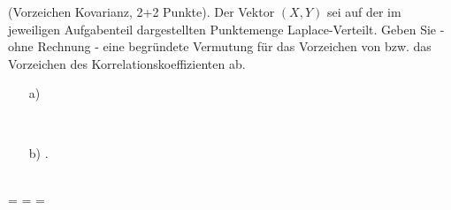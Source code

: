 \documentclass[twoside]{article}
\begin{document}
(Vorzeichen Kovarianz, 2+2 Punkte).
Der Vektor $(X,Y)$ sei auf der im jeweiligen Aufgabenteil dargestellten Punktemenge Laplace-Verteilt.
Geben Sie - ohne Rechnung - eine begründete Vermutung für das Vorzeichen von  bzw. das Vorzeichen des Korrelationskoeffizienten ab.\\
\begin{minipage}[t]{0.48\textwidth}
	\begin{enumerate}
		\item[a)]
	\end{enumerate}
\end{minipage}
~~
\begin{minipage}[t]{0.48\textwidth}
	\begin{enumerate}
		\item[b)] .
	\end{enumerate}
\end{minipage}\\
\fi
\ifnum\ZettelZehn=\True
{}
\fi
\ifnum\ZettelElf=\True
{}
\fi
\ifnum\ZettelZwoelf=\True
{}
\fi
\end{document}
